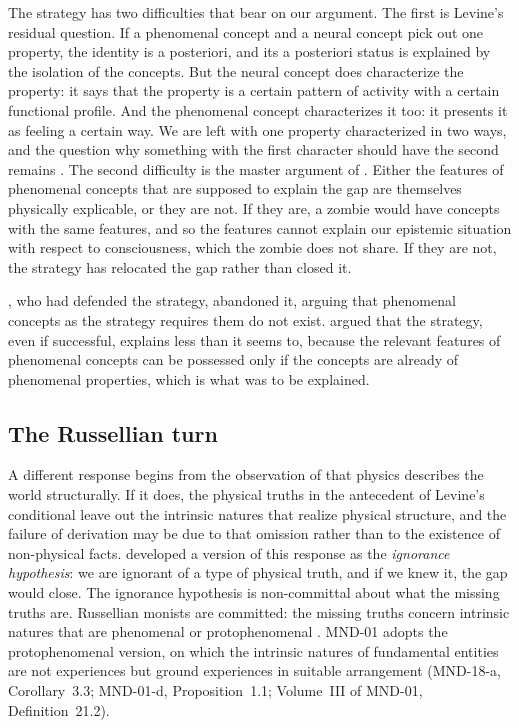 \documentclass{situationist-preprint}
\begin{document}
The strategy has two difficulties that bear on our argument. The first is Levine's residual question. If a phenomenal concept and a neural concept pick out one property, the identity is a posteriori, and its a posteriori status is explained by the isolation of the concepts. But the neural concept does characterize the property: it says that the property is a certain pattern of activity with a certain functional profile. And the phenomenal concept characterizes it too: it presents it as feeling a certain way. We are left with one property characterized in two ways, and the question why something with the first character should have the second remains \citep{Levine2001}. The second difficulty is the master argument of \citet{Chalmers2007}. Either the features of phenomenal concepts that are supposed to explain the gap are themselves physically explicable, or they are not. If they are, a zombie would have concepts with the same features, and so the features cannot explain our epistemic situation with respect to consciousness, which the zombie does not share. If they are not, the strategy has relocated the gap rather than closed it.

\citet{Tye2009}, who had defended the strategy, abandoned it, arguing that phenomenal concepts as the strategy requires them do not exist. \citet{Stoljar2005} argued that the strategy, even if successful, explains less than it seems to, because the relevant features of phenomenal concepts can be possessed only if the concepts are already of phenomenal properties, which is what was to be explained.

\subsection{The Russellian turn}

A different response begins from the observation of \citet{Russell1927} that physics describes the world structurally. If it does, the physical truths in the antecedent of Levine's conditional leave out the intrinsic natures that realize physical structure, and the failure of derivation may be due to that omission rather than to the existence of non-physical facts. \citet{Stoljar2006} developed a version of this response as the \emph{ignorance hypothesis}: we are ignorant of a type of physical truth, and if we knew it, the gap would close. The ignorance hypothesis is non-committal about what the missing truths are. Russellian monists are committed: the missing truths concern intrinsic natures that are phenomenal or protophenomenal \citep{Chalmers1996,Goff2017}. MND-01 adopts the protophenomenal version, on which the intrinsic natures of fundamental entities are not experiences but ground experiences in suitable arrangement (MND-18-a, Corollary~3.3; MND-01-d, Proposition~1.1; Volume~III of MND-01, Definition~21.2).
\end{document}
